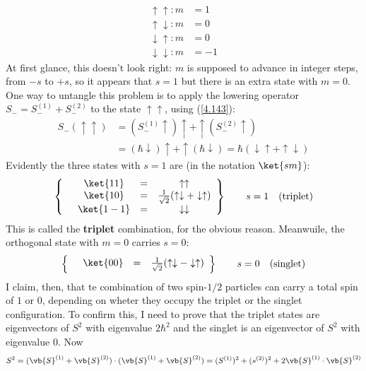 \begin{align*}
	\uparrow\uparrow :m&=1\\
	\uparrow\downarrow :m&=0\\
	\downarrow\uparrow :m&=0\\
	\downarrow\downarrow :m&=-1
\end{align*}
At first glance, this doesn't look right: $m$ is supposed to advance in integer steps, from $-s$ to $+s$, so it appears that $s=1$ but there is an extra state with $m=0$. One way to untangle this problem is to apply the lowering operator $S_-=S_-^{(1)}+S_-^{(2)}$ to the state $\uparrow\uparrow$, using (\ref{4.143}):
\begin{align*}
	S_-(\uparrow\uparrow)&=(S_-^{(1)}\uparrow)\uparrow + \uparrow(S_-^{(2)}\uparrow)\\
											 &=(\hbar\downarrow)\uparrow+\uparrow(\hbar\downarrow)=\hbar(\downarrow\uparrow + \uparrow\downarrow)
\end{align*}
Evidently the three states with $s=1$ are (in the notation $\ket{sm}$):
\begin{equation}\label{4.177}
\left	\{
	\begin{array}{cccc}
	&\ket{11}&=&\uparrow\uparrow\\
	&\ket{10}&=&\frac{1}{\sqrt{2}}(\uparrow\downarrow + \downarrow\uparrow)\\
	&\ket{1-1}&=&\downarrow\downarrow
\end{array}
\right \}\qquad s=1 \quad \mbox{(triplet)}
\end{equation}
This is called the \textbf{triplet} combination, for the obvious reason. Meanwuile, the orthogonal state with $m=0$ carries $s=0$:
\begin{equation}\label{4.178}
	\left \{
		\begin{array}{cccc}
			&\ket{00}&=&\frac{1}{\sqrt{2}}(\uparrow\downarrow - \downarrow\uparrow)
		\end{array}
	\right \}\qquad s=0\quad \mbox{(singlet)}
\end{equation}
I claim, then, that te combination of two spin-$1/2$ particles can carry a total spin of $1$ or $0$, depending on wheter they occupy the triplet or the singlet configuration. To confirm this, I need to prove that the triplet states are eigenvectors of $S^2$ with eigenvalue $2\hbar^2$ and the singlet is an eigenvector of $S^2$ with eigenvalue $0$. Now
\begin{equation}\label{4.179}
	S^2=(\vb{S}^{(1)}+\vb{S}^{(2)})\cdot (\vb{S}^{(1)}+\vb{S}^{(2)})=(S^{(1)})^2+(s^{(2)})^2+2\vb{S}^{(1)}\cdot\vb{S}^{(2)}
\end{equation}
